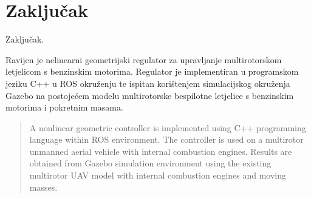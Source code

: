 \documentclass[times, utf8, diplomski]{fer}
\begin{document}
	
\chapter{Zaključak}
Zaključak.




\begin{sazetak}
Ravijen je nelinearni geometrijski regulator za upravljanje multirotorskom letjelicom s benzinskim motorima. Regulator je implementiran u programskom jeziku C++ u ROS okruženju te ispitan korištenjem simulacijskog okruženja Gazebo na postojećem modelu multirotorske bespilotne letjelice s benzinskim motorima i pokretnim masama.

\end{sazetak}

\begin{abstract}
A nonlinear geometric controller is implemented using C++ programming language within ROS environment. The controller is used on a multirotor unmanned aerial vehicle with internal combustion engines. Results are obtained from Gazebo simulation environment using the existing multirotor UAV model with internal combustion engines and moving masses.

\end{abstract}
\end{document}
